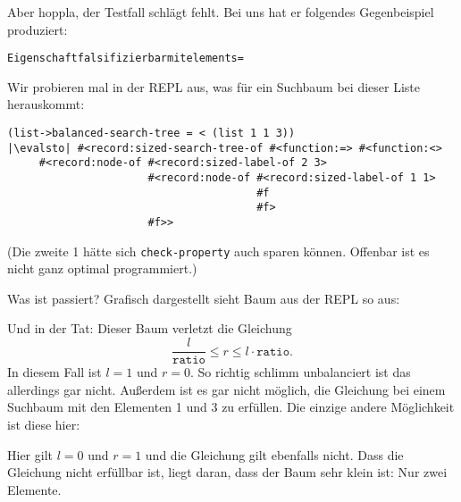 Aber hoppla, der Testfall schlägt fehlt.  Bei uns hat er folgendes
Gegenbeispiel produziert:
%
\begin{alltt}
Eigenschaft falsifizierbar mit elements = 
\end{alltt}
%
Wir probieren mal in der REPL aus, was für ein Suchbaum bei dieser
Liste herauskommt:
%
\begin{lstlisting}
(list->balanced-search-tree = < (list 1 1 3))
|\evalsto| #<record:sized-search-tree-of #<function:=> #<function:<> 
     #<record:node-of #<record:sized-label-of 2 3>
                      #<record:node-of #<record:sized-label-of 1 1> 
                                       #f
                                       #f>
                      #f>>
\end{lstlisting}
%
(Die zweite 1 hätte sich \lstinline{check-property} auch sparen
können.  Offenbar ist es nicht ganz optimal programmiert.)

Was ist passiert?  Grafisch dargestellt sieht Baum aus der REPL so
aus:
%
\begin{center}
\end{center}
%
Und in der Tat: Dieser Baum verletzt die Gleichung
\[\frac{l}{\mathtt{ratio}} \leq r \leq l \cdot \mathtt{ratio}.\]
In diesem Fall ist $l=1$ und $r=0$.  So richtig schlimm unbalanciert
ist das allerdings gar nicht.  Außerdem ist es gar nicht möglich, die
Gleichung bei einem Suchbaum mit den Elementen 1 und 3 zu erfüllen.
Die einzige andere Möglichkeit ist diese hier:

%
\begin{center}
\end{center}
%
Hier gilt $l=0$ und $r=1$ und die Gleichung gilt ebenfalls nicht.
Dass die Gleichung nicht erfüllbar ist, liegt daran, dass der Baum
sehr klein ist: Nur zwei Elemente.

